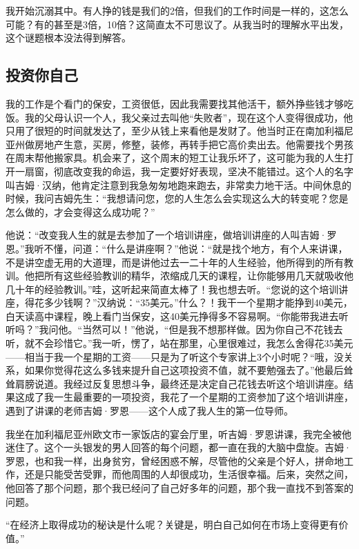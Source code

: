我开始沉溺其中。有人挣的钱是我们的2倍，但我们的工作时间是一样的，这怎么可能？有的甚至是3倍，10倍？这简直太不可思议了。从我当时的理解水平出发，这个谜题根本没法得到解答。

\subsection{投资你自己}

我的工作是个看门的保安，工资很低，因此我需要找其他活干，额外挣些钱才够吃饭。我的父母认识一个人，我父亲过去叫他“失败者”，现在这个人变得很成功，他只用了很短的时间就发达了，至少从钱上来看他是发财了。他当时正在南加利福尼亚州做房地产生意，买房，修整，装修，再转手把它高价卖出去。他需要找个男孩在周末帮他搬家具。机会来了，这个周末的短工让我乐坏了，这可能为我的人生打开一扇窗，彻底改变我的命运，我一定要好好表现，坚决不能错过。这个人的名字叫吉姆·汉纳，他肯定注意到我急匆匆地跑来跑去，非常卖力地干活。中间休息的时候，我问吉姆先生：“我想请问您，您的人生怎么会实现这么大的转变呢？您是怎么做的，才会变得这么成功呢？”

他说：“改变我人生的就是去参加了一个培训讲座，做培训讲座的人叫吉姆·罗恩。”我听不懂，问道：“什么是讲座啊？”他说：“就是找个地方，有个人来讲课，不是讲空虚无用的大道理，而是讲他过去一二十年的人生经验，他所得到的所有教训。他把所有这些经验教训的精华，浓缩成几天的课程，让你能够用几天就吸收他几十年的经验教训。”哇，这听起来简直太棒了！我也想去听。“您说的这个培训讲座，得花多少钱啊？”汉纳说：“35美元。”什么？！我干一个星期才能挣到40美元，白天读高中课程，晚上看门当保安，这40美元挣得多不容易啊。“你能带我进去听听吗？”我问他。“当然可以！”他说，“但是我不想那样做。因为你自己不花钱去听，就不会珍惜它。”我一听，愣了，站在那里，心里很难过，我怎么舍得花35美元——相当于我一个星期的工资——只是为了听这个专家讲上3个小时呢？“哦，没关系，如果你觉得花这么多钱来提升自己这项投资不值，就不要勉强去了。”他最后耸耸肩膀说道。我经过反复思想斗争，最终还是决定自己花钱去听这个培训讲座。结果这成了我一生最重要的一项投资，我花了一个星期的工资参加了这个培训讲座，遇到了讲课的老师吉姆·罗恩——这个人成了我人生的第一位导师。

我坐在加利福尼亚州欧文市一家饭店的宴会厅里，听吉姆·罗恩讲课，我完全被他迷住了。这个一头银发的男人回答的每个问题，都一直在我的大脑中盘旋。吉姆·罗恩，也和我一样，出身贫穷，曾经困惑不解，尽管他的父亲是个好人，拼命地工作，还是只能受苦受罪，而他周围的人却很成功，生活很幸福。后来，突然之间，他回答了那个问题，那个我已经问了自己好多年的问题，那个我一直找不到答案的问题。

“在经济上取得成功的秘诀是什么呢？关键是，明白自己如何在市场上变得更有价值。”

